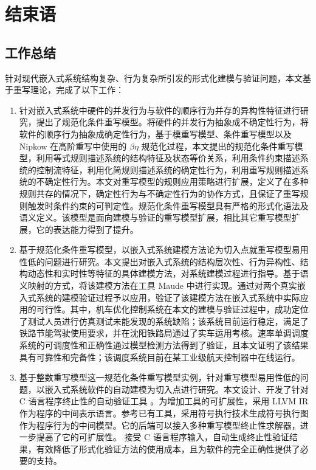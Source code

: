 \chapter{结束语}
\label{cha:conclusion}

\section{工作总结}

针对现代嵌入式系统结构复杂、行为复杂所引发的形式化建模与验证问题，本文基于重写理论，完成了以下工作：

\begin{enumerate}
\item 
针对嵌入式系统中硬件的并发行为与软件的顺序行为并存的异构性特征进行研究，提出了规范化条件重写模型。将硬件的并发行为抽象成不确定性行为，将软件的顺序行为抽象成确定性行为，基于模重写模型、条件重写模型以及 Nipkow 在高阶重写中使用的 $\beta\eta$ 规范化过程，本文提出的规范化条件重写模型，利用等式规则描述系统的结构特征及状态等价关系，利用条件约束描述系统的控制流特征，利用化简规则描述系统的确定性行为，利用重写规则描述系统的不确定性行为。本文对重写模型的规则应用策略进行扩展，定义了在多种规则共存的情况下，确定性行为与不确定性行为的协作方式，且保证了重写规则触发时条件约束的可判定性。规范化条件重写模型具有严格的形式化语法及语义定义。该模型是面向建模与验证的重写模型扩展，相比其它重写模型扩展，它的表达能力得到了提升。

\item
基于规范化条件重写模型，以嵌入式系统建模方法论为切入点就重写模型易用性低的问题进行研究。本文提出对嵌入式系统的结构层次性、行为异构性、结构动态性和实时性等特征的具体建模方法，对系统建模过程进行指导。基于语义映射的方式，将该建模方法在工具 Maude 中进行实现。通过对两个真实嵌入式系统的建模验证过程予以应用，验证了该建模方法在嵌入式系统中实际应用的可行性。其中，机车优化控制系统在本文的建模与验证过程中，成功定位了测试人员进行仿真测试未能发现的系统缺陷；该系统目前运行稳定，满足了铁路节能驾驶使用要求，并在沈阳铁路局通过了实车运用考核。速率单调调度系统的可调度性和正确性通过模型检测方法得到了验证，且本文证明了该结果具有可靠性和完备性；该调度系统目前在某工业级航天控制器中在线运行。

\item 
基于整数重写模型这一规范化条件重写模型实例，针对重写模型易用性低的问题，以嵌入式系统软件的自动建模为切入点进行研究。本文设计、开发了针对 C 语言程序终止性的自动验证工具 \CTerm。为增加工具的可扩展性，\CTerm 采用 LLVM IR 作为程序的中间表示语言。参考已有工具，\CTerm 采用符号执行技术生成符号执行图作为程序行为的中间模型。它的后端可以接入多种重写模型终止性求解器，进一步提高了它的可扩展性。 \CTerm 接受 C 语言程序输入，自动生成终止性验证结果，有效降低了形式化验证方法的使用成本，且为软件的完全正确性提供了必要的支持。 
\end{enumerate}

